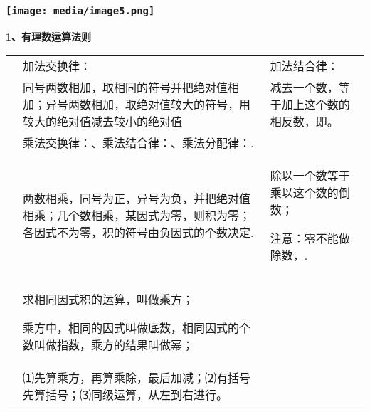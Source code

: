\documentclass[a4paper,11pt,UTF8]{ctexart}
\begin{document}
\hypertarget{ux5b66ux79d1ux7f51www.zxxk.com--ux6559ux80b2ux8d44ux6e90ux95e8ux6237ux63d0ux4f9bux8bd5ux9898ux8bd5ux5377ux6559ux6848ux8bfeux4ef6ux6559ux5b66ux8bbaux6587ux7d20ux6750ux7b49ux5404ux7c7bux6559ux5b66ux8d44ux6e90ux5e93ux4e0bux8f7dux8fd8ux6709ux5927ux91cfux4e30ux5bccux7684ux6559ux5b66ux8d44ux8baf-1}{%
\subsubsection{\texorpdfstring{\protect\texttt{[image: media/image5.png]}}{学科网(www.zxxk.com)-\/-教育资源门户，提供试题试卷、教案、课件、教学论文、素材等各类教学资源库下载，还有大量丰富的教学资讯！}}\label{ux5b66ux79d1ux7f51www.zxxk.com--ux6559ux80b2ux8d44ux6e90ux95e8ux6237ux63d0ux4f9bux8bd5ux9898ux8bd5ux5377ux6559ux6848ux8bfeux4ef6ux6559ux5b66ux8bbaux6587ux7d20ux6750ux7b49ux5404ux7c7bux6559ux5b66ux8d44ux6e90ux5e93ux4e0bux8f7dux8fd8ux6709ux5927ux91cfux4e30ux5bccux7684ux6559ux5b66ux8d44ux8baf-1}}

\textbf{1、有理数运算法则}

\begin{longtable}[]{@{}lll@{}}
\toprule
\endhead
& 加法交换律： & 加法结合律：\tabularnewline
&
同号两数相加，取相同的符号并把绝对值相加；异号两数相加，取绝对值较大的符号，用较大的绝对值减去较小的绝对值
& 减去一个数，等于加上这个数的相反数，即。\tabularnewline
& 乘法交换律：、乘法结合律：、乘法分配律：. &\tabularnewline
\begin{minipage}[t]{0.30\columnwidth}\raggedright
\strut
\end{minipage} & \begin{minipage}[t]{0.30\columnwidth}\raggedright
两数相乘，同号为正，异号为负，并把绝对值相乘；几个数相乘，某因式为零，则积为零；各因式不为零，积的符号由负因式的个数决定.\strut
\end{minipage} & \begin{minipage}[t]{0.30\columnwidth}\raggedright
除以一个数等于乘以这个数的倒数；

注意：零不能做除数，.\strut
\end{minipage}\tabularnewline
\begin{minipage}[t]{0.30\columnwidth}\raggedright
\strut
\end{minipage} & \begin{minipage}[t]{0.30\columnwidth}\raggedright
求相同因式积的运算，叫做乘方；

乘方中，相同的因式叫做底数，相同因式的个数叫做指数，乘方的结果叫做幂；\strut
\end{minipage} & \begin{minipage}[t]{0.30\columnwidth}\raggedright
\strut
\end{minipage}\tabularnewline
&
⑴先算乘方，再算乘除，最后加减；⑵有括号先算括号；⑶同级运算，从左到右进行。
&\tabularnewline
\bottomrule
\end{longtable}
\end{document}
